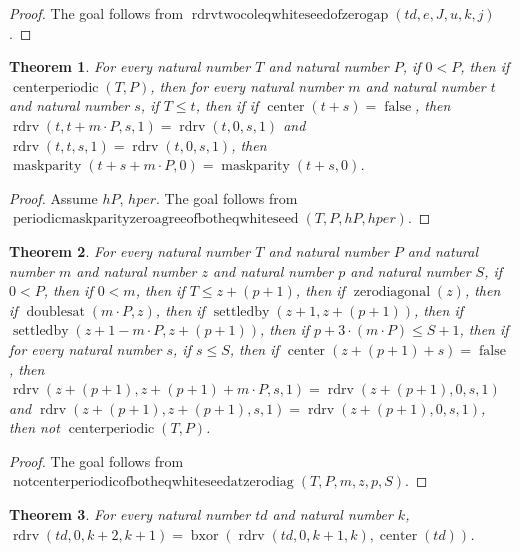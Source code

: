 \documentclass[11pt]{article}
\newtheorem{theorem}{Theorem}[section]
\theoremstyle{definition}
\begin{document}
\begin{proof}
The goal follows from \(\operatorname{rdrvtwocoleqwhiteseedofzerogap}(td, e, J, u, k, j)\).
\end{proof}
\begin{theorem}
\label{ll:paper:periodic-maskparity-zero-agree-of-both-eq-white-seed}
For every natural number \(T\) and natural number \(P\), if \(0 < P\), then if \(\operatorname{centerperiodic}(T, P)\), then for every natural number \(m\) and natural number \(t\) and natural number \(s\), if \(T \le t\), then if if \(\operatorname{center}(t + s) = \operatorname{false}\), then \(\operatorname{rdrv}(t, t + m \cdot P, s, 1) = \operatorname{rdrv}(t, 0, s, 1)\) and \(\operatorname{rdrv}(t, t, s, 1) = \operatorname{rdrv}(t, 0, s, 1)\), then \(\operatorname{maskparity}(t + s + m \cdot P, 0) = \operatorname{maskparity}(t + s, 0)\).
\end{theorem}
\begin{proof}
Assume \(hP\), \(hper\).
The goal follows from \(\operatorname{periodicmaskparityzeroagreeofbotheqwhiteseed}(T, P, hP, hper)\).
\end{proof}
\begin{theorem}
\label{ll:paper:not-centerperiodic-of-both-eq-white-seed-at-zero-diag}
For every natural number \(T\) and natural number \(P\) and natural number \(m\) and natural number \(z\) and natural number \(p\) and natural number \(S\), if \(0 < P\), then if \(0 < m\), then if \(T \le z + (p + 1)\), then if \(\operatorname{zerodiagonal}(z)\), then if \(\operatorname{doublesat}(m \cdot P, z)\), then if \(\operatorname{settledby}(z + 1, z + (p + 1))\), then if \(\operatorname{settledby}(z + 1 - m \cdot P, z + (p + 1))\), then if \(p + 3 \cdot (m \cdot P) \le S + 1\), then if for every natural number \(s\), if \(s \le S\), then if \(\operatorname{center}(z + (p + 1) + s) = \operatorname{false}\), then \(\operatorname{rdrv}(z + (p + 1), z + (p + 1) + m \cdot P, s, 1) = \operatorname{rdrv}(z + (p + 1), 0, s, 1)\) and \(\operatorname{rdrv}(z + (p + 1), z + (p + 1), s, 1) = \operatorname{rdrv}(z + (p + 1), 0, s, 1)\), then not \(\operatorname{centerperiodic}(T, P)\).
\end{theorem}
\begin{proof}
The goal follows from \(\operatorname{notcenterperiodicofbotheqwhiteseedatzerodiag}(T, P, m, z, p, S)\).
\end{proof}
\begin{theorem}
\label{ll:paper:rdrv-white-seed-subdiag-one-step}
For every natural number \(td\) and natural number \(k\), \(\operatorname{rdrv}(td, 0, k + 2, k + 1) = \operatorname{bxor}(\operatorname{rdrv}(td, 0, k + 1, k), \operatorname{center}(td))\).
\end{theorem}
\end{document}
